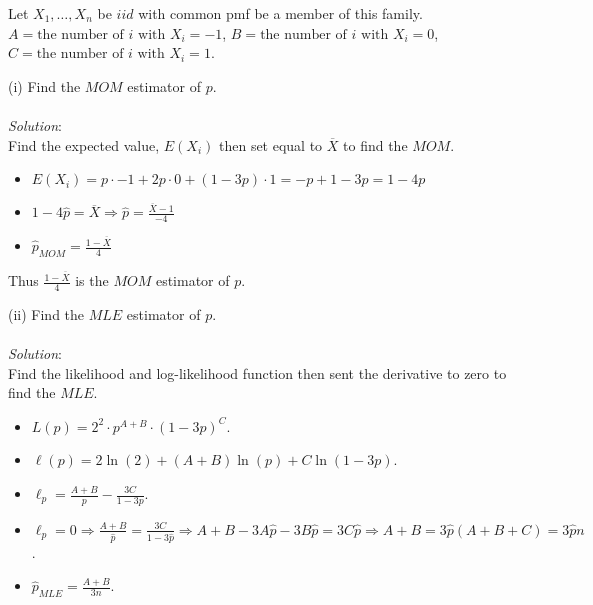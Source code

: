 \documentclass[12pt]{article}
\newcommand{\XB}{\color{black}}
\newcommand{\XBB}{\color{blue}}
\newcommand{\ds}{\displaystyle}
\begin{document}
Let $ X_{1}, \dots , X_{n} $ be  $ iid $ with common pmf be a member of this family. \\

$ A = \text{the number of $i$ with } X_{i} = -1 $, $ B = \text{the number of $i$ with } X_{i} = 0 $, $ C = \text{the number of $i$ with } X_{i} = 1 $. \\

\XBB\hrulefill\XB 
\vspace{5mm} 

(i) Find the $ MOM $ estimator of $ p $. \\
\vspace{2.5mm} \\
\textit{Solution}:
\vspace{2.5mm} \\ 

\noindent
Find the expected value, $ E(X_{i}) $ then set equal to $ \overline{X} $ to find the $ MOM $. \\

\begin{itemize}
    \item $ \ds E(X_{i}) = p \cdot -1 + 2p \cdot 0 + (1 - 3p) \cdot 1 = -p + 1 -3p = 1 - 4p $
    \item $ \ds 1 - 4\hat{p} = \overline{X} \Rightarrow \hat{p} = \frac{\overline{X} - 1}{-4} $
    \item $ \ds \hat{p}_{MOM} = \frac{1 - \overline{X}}{4} $
\end{itemize}

\noindent
Thus $ \ds \frac{1 - \overline{X}}{4} $ is the $ MOM $ estimator of $ p $. \\

\vspace{2.5mm}
\newpage

(ii) Find the $ MLE $ estimator of $ p $. \\
\vspace{2.5mm} \\
\textit{Solution}:
\vspace{2.5mm} \\

\noindent
Find the likelihood and log-likelihood function then sent the derivative to zero to find the $ MLE $. \\

\begin{itemize}
    \item $ \ds L(p) = 2^{2} \cdot p^{A + B} \cdot (1 - 3p)^{C} $.
    \item $ \ds \ell(p) = 2\ln(2) + (A + B)\ln(p) + C\ln(1 - 3p) $.
    \item $ \ds \ell_{p} = \frac{A + B}{p} - \frac{3C}{1 - 3p} $.
    \item $ \ds \ell_{p} = 0 \Rightarrow \frac{A + B}{\hat{p}} = \frac{3C}{1 - 3\hat{p}} \Rightarrow A + B - 3A\hat{p} - 3B\hat{p} = 3C\hat{p} \Rightarrow A + B = 3\hat{p}(A + B + C) = 3\hat{p}n $.
    \item $ \ds \hat{p}_{MLE} = \frac{A + B}{3n} $.
\end{itemize}
\end{document}
